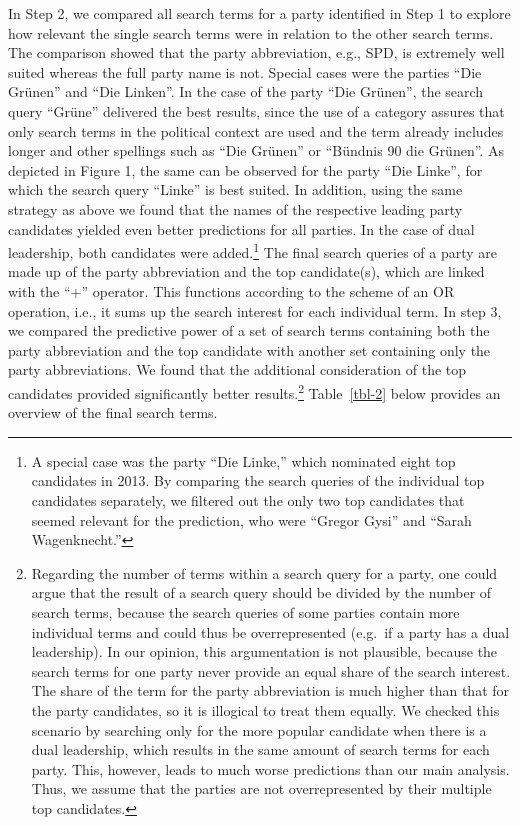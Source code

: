 \documentclass[
  letterpaper,
  DIV=11,
  numbers=noendperiod]{scrartcl}
\begin{document}
In Step 2, we compared all search terms for a party identified in Step 1
to explore how relevant the single search terms were in relation to the
other search terms. The comparison showed that the party abbreviation,
e.g., SPD, is extremely well suited whereas the full party name is not.
Special cases were the parties ``Die Grünen'' and ``Die Linken''. In the
case of the party ``Die Grünen'', the search query ``Grüne'' delivered
the best results, since the use of a category assures that only search
terms in the political context are used and the term already includes
longer and other spellings such as ``Die Grünen'' or ``Bündnis 90 die
Grünen''. As depicted in Figure 1, the same can be observed for the
party ``Die Linke'', for which the search query ``Linke'' is best
suited. In addition, using the same strategy as above we found that the
names of the respective leading party candidates yielded even better
predictions for all parties. In the case of dual leadership, both
candidates were added.\footnote{A special case was the party ``Die
  Linke,'' which nominated eight top candidates in 2013. By comparing
  the search queries of the individual top candidates separately, we
  ﬁltered out the only two top candidates that seemed relevant for the
  prediction, who were ``Gregor Gysi'' and ``Sarah Wagenknecht.''} The
ﬁnal search queries of a party are made up of the party abbreviation and
the top candidate(s), which are linked with the ``+'' operator. This
functions according to the scheme of an OR operation, i.e., it sums up
the search interest for each individual term. In step 3, we compared the
predictive power of a set of search terms containing both the party
abbreviation and the top candidate with another set containing only the
party abbreviations. We found that the additional consideration of the
top candidates provided signiﬁcantly better results.\footnote{Regarding
  the number of terms within a search query for a party, one could argue
  that the result of a search query should be divided by the number of
  search terms, because the search queries of some parties contain more
  individual terms and could thus be overrepresented (e.g.~if a party
  has a dual leadership). In our opinion, this argumentation is not
  plausible, because the search terms for one party never provide an
  equal share of the search interest. The share of the term for the
  party abbreviation is much higher than that for the party candidates,
  so it is illogical to treat them equally. We checked this scenario by
  searching only for the more popular candidate when there is a dual
  leadership, which results in the same amount of search terms for each
  party. This, however, leads to much worse predictions than our main
  analysis. Thus, we assume that the parties are not overrepresented by
  their multiple top candidates.} Table~\ref{tbl-2} below provides an
overview of the ﬁnal search terms.
\end{document}
